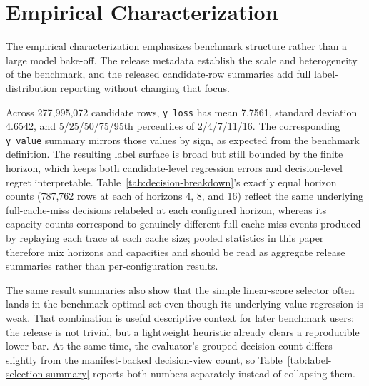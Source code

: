 \section{Empirical Characterization}
\label{sec:characterization}

The empirical characterization emphasizes benchmark structure rather than a large model bake-off. The release metadata establish the scale and heterogeneity of the benchmark, and the released candidate-row summaries add full label-distribution reporting without changing that focus.

Across 277,995,072 candidate rows, \texttt{y\_loss} has mean 7.7561, standard deviation 4.6542, and 5/25/50/75/95th percentiles of 2/4/7/11/16. The corresponding \texttt{y\_value} summary mirrors those values by sign, as expected from the benchmark definition. The resulting label surface is broad but still bounded by the finite horizon, which keeps both candidate-level regression errors and decision-level regret interpretable. Table~\ref{tab:decision-breakdown}'s exactly equal horizon counts (787,762 rows at each of horizons 4, 8, and 16) reflect the same underlying full-cache-miss decisions relabeled at each configured horizon, whereas its capacity counts correspond to genuinely different full-cache-miss events produced by replaying each trace at each cache size; pooled statistics in this paper therefore mix horizons and capacities and should be read as aggregate release summaries rather than per-configuration results.

The same result summaries also show that the simple linear-score selector often lands in the benchmark-optimal set even though its underlying value regression is weak. That combination is useful descriptive context for later benchmark users: the release is not trivial, but a lightweight heuristic already clears a reproducible lower bar. At the same time, the evaluator's grouped decision count differs slightly from the manifest-backed decision-view count, so Table~\ref{tab:label-selection-summary} reports both numbers separately instead of collapsing them.






